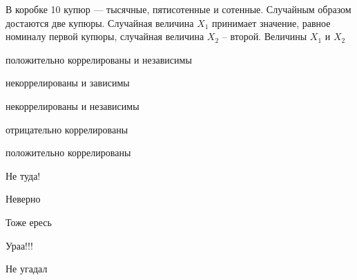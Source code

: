 
\begin{question}
В коробке 10 купюр — тысячные, пятисотенные и сотенные. Случайным
образом достаются две купюры. Случайная величина \(X_1\) принимает
значение, равное номиналу первой купюры, случайная величина \(X_2\) --
второй. Величины \(X_1\) и \(X_2\)
\begin{answerlist}
  \item положительно коррелированы и независимы
  \item некоррелированы и зависимы
  \item некоррелированы и независимы
  \item отрицательно коррелированы
  \item положительно коррелированы
\end{answerlist}
\end{question}

\begin{solution}
\begin{answerlist}
  \item Не туда!
  \item Неверно
  \item Тоже ересь
  \item Ураа!!!
  \item Не угадал
\end{answerlist}
\end{solution}

